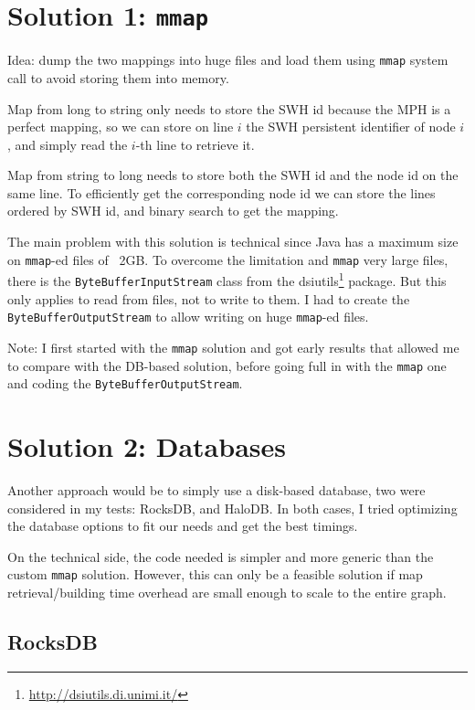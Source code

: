 \documentclass[11pt,a4paper]{article}
\newcommand{\mmap}{\texttt{mmap}}
\begin{document}
\section{Solution 1: \mmap{}}

Idea: dump the two mappings into huge files and load them using \mmap{} system
call to avoid storing them into memory.

Map from long to string only needs to store the SWH id because the MPH is a
perfect mapping, so we can store on line $i$ the SWH persistent identifier of
node $i$, and simply read the $i$-th line to retrieve it.

Map from string to long needs to store both the SWH id and the node id on the
same line. To efficiently get the corresponding node id we can store the lines
ordered by SWH id, and binary search to get the mapping.

The main problem with this solution is technical since Java has a maximum size
on \mmap{}-ed files of ~2GB. To overcome the limitation and \mmap{} very large
files, there is the \texttt{ByteBufferInputStream} class from the
dsiutils\footnote{\url{http://dsiutils.di.unimi.it/}} package. But this only
applies to read from files, not to write to them. I had to create the
\texttt{ByteBufferOutputStream} to allow writing on huge \mmap{}-ed
files.

Note: I first started with the \mmap{} solution and got early results that
allowed me to compare with the DB-based solution, before going full in with the
\mmap{} one and coding the \texttt{ByteBufferOutputStream}.

\section{Solution 2: Databases}

Another approach would be to simply use a disk-based database, two were
considered in my tests: RocksDB, and HaloDB. In both cases, I tried optimizing
the database options to fit our needs and get the best timings.

On the technical side, the code needed is simpler and more generic than the
custom \mmap{} solution.  However, this can only be a feasible solution if map
retrieval/building time overhead are small enough to scale to the entire graph.

\subsection{RocksDB}
\end{document}
